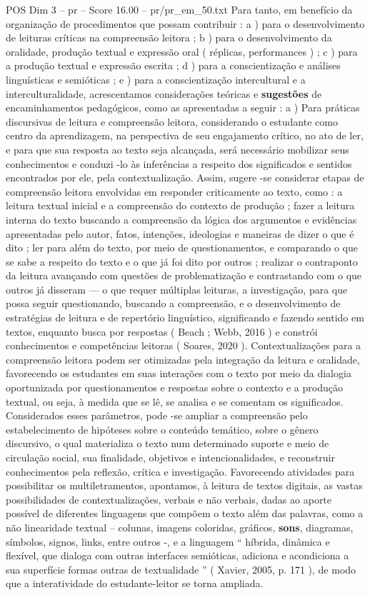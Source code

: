 \begin{textsample}{POS Dim 3 – pr – Score 16.00 – pr/pr\_em\_50.txt}
Para tanto, em benefício da organização de procedimentos que possam contribuir : a ) para o desenvolvimento de leituras críticas na compreensão leitora ; b ) para o desenvolvimento da oralidade, produção textual e expressão oral ( réplicas, performances ) ; c ) para a produção textual e expressão escrita ; d ) para a conscientização e análises linguísticas e semióticas ; e ) para a conscientização intercultural e a interculturalidade, acrescentamos considerações teóricas e \textbf{sugestões} de encaminhamentos pedagógicos, como as apresentadas a seguir : a ) Para práticas discursivas de leitura e compreensão leitora, considerando o estudante como centro da aprendizagem, na perspectiva de seu engajamento crítico, no ato de ler, e para que sua resposta ao texto seja alcançada, será necessário mobilizar seus conhecimentos e conduzi -lo às inferências a respeito dos significados e sentidos encontrados por ele, pela contextualização.
Assim, sugere -se considerar etapas de compreensão leitora envolvidas em responder criticamente ao texto, como : a leitura textual inicial e a compreensão do contexto de produção ; fazer a leitura interna do texto buscando a compreensão da lógica dos argumentos e evidências apresentadas pelo autor, fatos, intenções, ideologias e maneiras de dizer o que é dito ; ler para além do texto, por meio de questionamentos, e comparando o que se sabe a respeito do texto e o que já foi dito por outros ; realizar o contraponto da leitura avançando com questões de problematização e contrastando com o que outros já disseram — o que requer múltiplas leituras, a investigação, para que possa seguir questionando, buscando a compreensão, e o desenvolvimento de estratégias de leitura e de repertório linguístico, significando e fazendo sentido em textos, enquanto busca por respostas ( Beach ; Webb, 2016 ) e constrói conhecimentos e competências leitoras ( Soares, 2020 ).
Contextualizações para a compreensão leitora podem ser otimizadas pela integração da leitura e oralidade, favorecendo os estudantes em suas interações com o texto por meio da dialogia oportunizada por questionamentos e respostas sobre o contexto e a produção textual, ou seja, à medida que se lê, se analisa e se comentam os significados.
Considerados esses parâmetros, pode -se ampliar a compreensão pelo estabelecimento de hipóteses sobre o conteúdo temático, sobre o gênero discursivo, o qual materializa o texto num determinado suporte e meio de circulação social, sua finalidade, objetivos e intencionalidades, e reconstruir conhecimentos pela reflexão, crítica e investigação.
Favorecendo atividades para possibilitar os multiletramentos, apontamos, à leitura de textos digitais, as vastas possibilidades de contextualizações, verbais e não verbais, dadas ao aporte possível de diferentes linguagens que compõem o texto além das palavras, como a não linearidade textual – colunas, imagens coloridas, gráficos, \textbf{sons}, diagramas, símbolos, signos, links, entre outros -, e a linguagem “ híbrida, dinâmica e flexível, que dialoga com outras interfaces semióticas, adiciona e acondiciona a sua superfície formas outras de textualidade ” ( Xavier, 2005, p. 171 ), de modo que a interatividade do estudante-leitor se torna ampliada.

\end{textsample}
